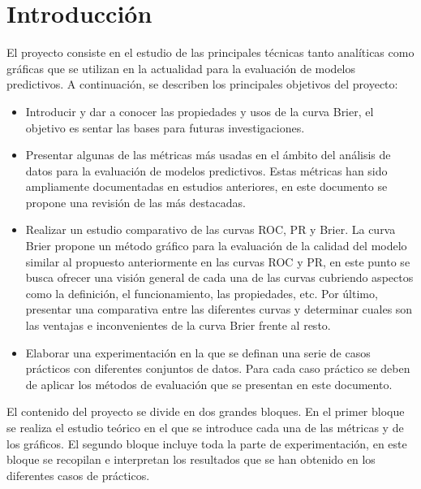 \section{Introducción}

El proyecto consiste en el estudio de las principales técnicas tanto analíticas como gráficas que se utilizan en la actualidad para la evaluación de modelos predictivos. A continuación, se describen los principales objetivos del proyecto:
\begin{itemize}
    \item Introducir y dar a conocer las propiedades y usos de la curva Brier, el objetivo es sentar las bases para futuras investigaciones. 
    \item Presentar algunas de las métricas más usadas en el ámbito del análisis de datos para la evaluación de modelos predictivos. Estas métricas han sido ampliamente documentadas en estudios anteriores, en este documento se propone una revisión de las más destacadas.
    \item Realizar un estudio comparativo de las curvas ROC, PR y Brier. La curva Brier propone un método gráfico para la evaluación de la calidad del modelo similar al propuesto anteriormente en las curvas ROC y PR, en este punto se busca ofrecer una visión general de cada una de las curvas cubriendo aspectos como la definición, el funcionamiento, las propiedades, etc. Por último, presentar una comparativa entre las diferentes curvas y determinar cuales son las ventajas e inconvenientes de la curva Brier frente al resto.
    \item Elaborar una experimentación en la que se definan una serie de casos prácticos con diferentes conjuntos de datos. Para cada caso práctico se deben de aplicar los métodos de evaluación que se presentan en este documento.
\end{itemize}

El contenido del proyecto se divide en dos grandes bloques.
En el primer bloque se realiza el estudio teórico en el que se introduce cada una de las métricas y de los gráficos.
El segundo bloque incluye toda la parte de experimentación, en este bloque se recopilan e interpretan los resultados que se han obtenido en los diferentes casos de prácticos.


\clearpage
